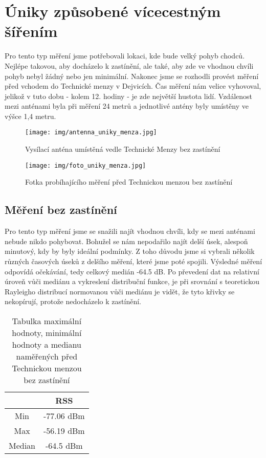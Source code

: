 \chapter{Úniky způsobené vícecestným šířením}
Pro tento typ měření jsme potřebovali lokaci, kde bude velký pohyb chodců. Nejlépe takovou, aby docházelo k zastínění, ale také, aby zde ve vhodnou chvíli pohyb nebyl žádný nebo jen minimální. Nakonec jsme se rozhodli provést měření před vchodem do Technické menzy v Dejvicích. Čas měření nám velice vyhovoval, jelikož v tuto dobu - kolem 12. hodiny - je zde největší hustota lidí. Vzdálenost mezi anténami byla při měření 24 metrů a jednotlivé antény byly umístěny ve výšce 1,4 metru.

\begin{figure}[h!]
    \centering
    \texttt{[image: img/antenna\_uniky\_menza.jpg]}
    \caption{Vysílací anténa umístěná vedle Technické Menzy bez zastínění}
    \label{fig:my_label}
\end{figure}

\begin{figure}[h!]
    \centering
    \texttt{[image: img/foto\_uniky\_menza.jpg]}
    \caption{Fotka probíhajícího měření před Technickou menzou bez zastínění}
    \label{fig:my_label}
\end{figure}

\section{Měření bez zastínění}
Pro tento typ měření jsme se snažili najít vhodnou chvíli, kdy se mezi anténami nebude nikdo pohybovat. Bohužel se nám nepodařilo najít delší úsek, alespoň minutový, kdy by byly ideální podmínky.  Z toho důvodu jsme si vybrali několik různých časových úseků z delšího měření, které jsme poté spojili. Výsledné měření odpovídá očekávání, tedy celkový medián -64.5 dB. Po převedení dat na relativní úroveň vůči mediánu a vykreslení distribuční funkce, je při srovnání s teoretickou Rayleigho distribucí normovanou vůči mediánu je vidět, že tyto křivky se nekopírují, protože nedocházelo k zastínění.

\begin{table}[h!]
\centering
\begin{tabular}{|c|c|}
  \hline
   & RSS \\
  \hline
  Min & -77.06 dBm\\
  \hline
  Max & -56.19 dBm\\
  \hline
  Median & -64.5 dBm \\
  \hline
\end{tabular}
\caption{Tabulka maximální hodnoty, minimální hodnoty a medianu naměřených před Technickou menzou bez zastínění}
\end{table}

